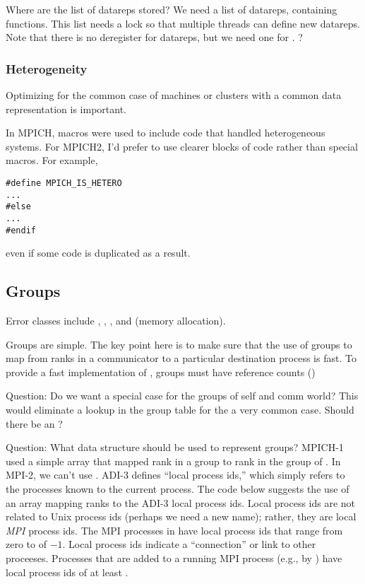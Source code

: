 \documentclass{article}
\begin{document}
Where are the list of datareps stored?  We need a list of datareps,
containing functions.  This list needs a lock so that multiple threads
can define new datareps.  Note that there is no deregister for
datareps, but we need one for .
? 

\subsubsection{Heterogeneity}
\label{sec:hetero}
Optimizing for the common case of machines or clusters with a common
data representation is important.  

In MPICH, macros were used to include code that handled heterogeneous
systems.  For MPICH2, I'd prefer to use clearer blocks of code rather
than special macros.  For example,
\begin{verbatim}
#define MPICH_IS_HETERO
...
#else
...
#endif
\end{verbatim}
even if some code is duplicated as a result.

\subsection{Groups}
\label{sec:groups}

Error classes include , , 
, and  (memory allocation). 

Groups are simple.  The key point here is to make sure that the use of
groups to map from ranks in a communicator to a particular destination
process is fast.
To provide a fast implementation of , groups must
have reference counts ()

Question: Do we want a special case for the groups of self and comm
world?  This would eliminate a lookup in the group table for the a very
common case.  Should there be an ?  

Question: What data structure should be used to represent groups?
MPICH-1 used a simple array that mapped rank in a group to rank in the
group of .  In MPI-2, we can't use
.  ADI-3 defines ``local process ids,'' which
simply refers to the processes known to the current process.  The code below
suggests the use of an array mapping ranks to the ADI-3 local process
ids.  Local 
process ids are not related to Unix process ids (perhaps we need a new name);
rather, they are local \emph{MPI} process ids.  The MPI processes in
 have local process ids that range from zero to
 of  $-1$.  Local process ids
indicate a ``connection'' or link to other proceeses.
Processes that are added to a
running MPI process (e.g., by ) have local process ids
of at least .
\end{document}
